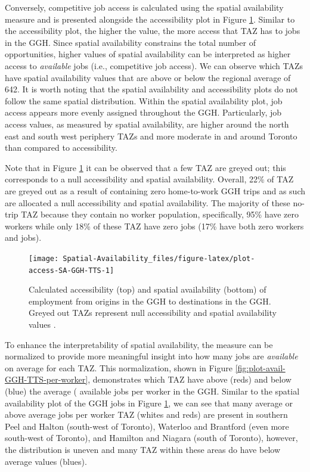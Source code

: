 \documentclass[]{elsarticle} %
\begin{document}
Conversely, competitive job access is calculated using the spatial
availability measure and is presented alongside the accessibility plot
in Figure \ref{fig:plot-access-SA-GGH-TTS}. Similar to the accessibility
plot, the higher the value, the more access that TAZ has to jobs in the
GGH. Since spatial availability constrains the total number of
opportunities, higher values of spatial availability can be interpreted
as higher access to \emph{available} jobs (i.e., competitive job
access). We can observe which TAZs have spatial availability values that
are above or below the regional average of 642. It is worth noting that
the spatial availability and accessibility plots do not follow the same
spatial distribution. Within the spatial availability plot, job access
appears more evenly assigned throughout the GGH. Particularly, job
access values, as measured by spatial availability, are higher around
the north east and south west periphery TAZs and more moderate in and
around Toronto than compared to accessibility.

Note that in Figure \ref{fig:plot-access-SA-GGH-TTS} it can be observed
that a few TAZ are greyed out; this corresponds to a null accessibility
and spatial availability. Overall, 22\% of TAZ are greyed out as a
result of containing zero home-to-work GGH trips and as such are
allocated a null accessibility and spatial availability. The majority of
these no-trip TAZ because they contain no worker population,
specifically, 95\% have zero workers while only 18\% of these TAZ have
zero jobs (17\% have both zero workers and jobs).

\begin{figure}
\texttt{[image: Spatial-Availability\_files/figure-latex/plot-access-SA-GGH-TTS-1]} \caption{\label{fig:plot-access-SA-GGH-TTS}Calculated accessibility (top) and spatial availability (bottom) of employment from origins in the GGH to destinations in the GGH. Greyed out TAZs represent null accessibility and spatial availability values .}\label{fig:plot-access-SA-GGH-TTS}
\end{figure}

\newpage

To enhance the interpretability of spatial availability, the measure can
be normalized to provide more meaningful insight into how many jobs are
\emph{available} on average for each TAZ. This normalization, shown in
Figure \ref{fig:plot-avail-GGH-TTS-per-worker}, demonstrates which TAZ
have above (reds) and below (blue) the average ( available jobs per
worker in the GGH. Similar to the spatial availability plot of the GGH
jobs in Figure \ref{fig:plot-access-SA-GGH-TTS}, we can see that many
average or above average jobs per worker TAZ (whites and reds) are
present in southern Peel and Halton (south-west of Toronto), Waterloo
and Brantford (even more south-west of Toronto), and Hamilton and
Niagara (south of Toronto), however, the distribution is uneven and many
TAZ within these areas do have below average values (blues).
\end{document}
